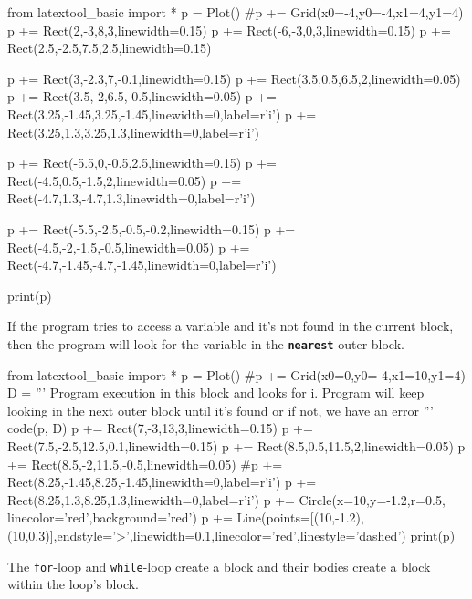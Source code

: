 \begin{python}
from latextool_basic import *
p = Plot()
#p += Grid(x0=-4,y0=-4,x1=4,y1=4)
p += Rect(2,-3,8,3,linewidth=0.15)
p += Rect(-6,-3,0,3,linewidth=0.15)
p += Rect(2.5,-2.5,7.5,2.5,linewidth=0.15)

p += Rect(3,-2.3,7,-0.1,linewidth=0.15)
p += Rect(3.5,0.5,6.5,2,linewidth=0.05)
p += Rect(3.5,-2,6.5,-0.5,linewidth=0.05)
p += Rect(3.25,-1.45,3.25,-1.45,linewidth=0,label=r'i')
p += Rect(3.25,1.3,3.25,1.3,linewidth=0,label=r'i')

p += Rect(-5.5,0,-0.5,2.5,linewidth=0.15)
p += Rect(-4.5,0.5,-1.5,2,linewidth=0.05)
p += Rect(-4.7,1.3,-4.7,1.3,linewidth=0,label=r'i')

p += Rect(-5.5,-2.5,-0.5,-0.2,linewidth=0.15)
p += Rect(-4.5,-2,-1.5,-0.5,linewidth=0.05)
p += Rect(-4.7,-1.45,-4.7,-1.45,linewidth=0,label=r'i')

print(p)
\end{python}
If the program tries to access a variable and it's not found in the current block, then the program will look for the variable in the \texttt{\textbf{nearest}} outer block.

\begin{python}
from latextool_basic import *
p = Plot()
#p += Grid(x0=0,y0=-4,x1=10,y1=4)
D = '''
Program execution in
this block and looks for
i. Program will keep
looking in the next outer
block until it's found or
if not, we have an error
'''
code(p, D)
p += Rect(7,-3,13,3,linewidth=0.15)
p += Rect(7.5,-2.5,12.5,0.1,linewidth=0.15)
p += Rect(8.5,0.5,11.5,2,linewidth=0.05)
p += Rect(8.5,-2,11.5,-0.5,linewidth=0.05)
#p += Rect(8.25,-1.45,8.25,-1.45,linewidth=0,label=r'i')
p += Rect(8.25,1.3,8.25,1.3,linewidth=0,label=r'i')
p += Circle(x=10,y=-1.2,r=0.5, linecolor='red',background='red')
p += Line(points=[(10,-1.2),(10,0.3)],endstyle='>',linewidth=0.1,linecolor='red',linestyle='dashed')
print(p)
\end{python}
The \texttt{for}-loop and \texttt{while}-loop create a block and their bodies create a block within the loop's block.
